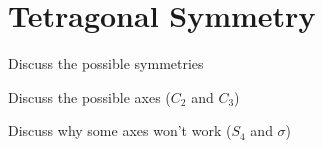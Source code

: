 \section{Tetragonal Symmetry}
\label{sec:symmetry}

\bit
\item Discuss the possible symmetries
\item Discuss the possible axes ($C_2$ and $C_3$)
\item Discuss why some axes won't work ($S_4$ and $\sigma$)
\eit

\placeholder

